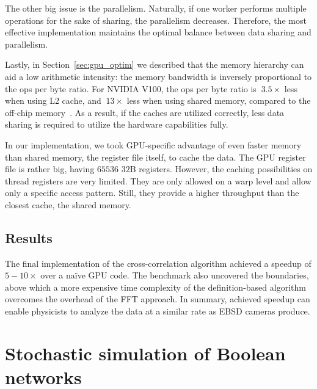 The other big issue is the parallelism. Naturally, if one worker performs multiple operations for the sake of sharing, the parallelism decreases. Therefore, the most effective implementation maintains the optimal balance between data sharing and parallelism.

Lastly, in Section~\ref{sec:gpu_optim} we described that the memory hierarchy can aid a low arithmetic intensity: the memory bandwidth is inversely proportional to the ops per byte ratio. For NVIDIA V100, the ops per byte ratio is $~3.5\times$ less when using L2 cache, and $~13\times$ less when using shared memory, compared to the off-chip memory~\cite{jia2018dissecting}. As a result, if the caches are utilized correctly, less data sharing is required to utilize the hardware capabilities fully.

In our implementation, we took GPU-specific advantage of even faster memory than shared memory, the register file itself, to cache the data. The GPU register file is rather big, having $65536$ $32$B registers. However, the caching possibilities on thread registers are very limited. They are only allowed on a warp level and allow only a specific access pattern. Still, they provide a higher throughput than the closest cache, the shared memory.

\subsection{Results}

The final implementation of the cross-correlation algorithm achieved a speedup of $5-10\times$ over a na\"{i}ve GPU code. The benchmark also uncovered the boundaries, above which a more expensive time complexity of the definition-based algorithm overcomes the overhead of the FFT approach. In summary, achieved speedup can enable physicists to analyze the data at a similar rate as EBSD cameras produce.


\section{Stochastic simulation of Boolean networks}
\label{sec:maboss}



